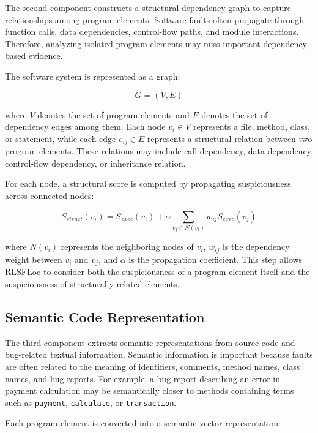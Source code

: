 \documentclass[article,article,submit,pdftex,moreauthors]{Definitions/mdpi}
\begin{document}
The second component constructs a structural dependency graph to capture relationships among program elements. Software faults often propagate through function calls, data dependencies, control-flow paths, and module interactions. Therefore, analyzing isolated program elements may miss important dependency-based evidence.

The software system is represented as a graph:

\begin{equation}
G = (V, E)
\end{equation}

where $V$ denotes the set of program elements and $E$ denotes the set of dependency edges among them. Each node $v_i \in V$ represents a file, method, class, or statement, while each edge $e_{ij} \in E$ represents a structural relation between two program elements. These relations may include call dependency, data dependency, control-flow dependency, or inheritance relation.

For each node, a structural score is computed by propagating suspiciousness across connected nodes:

\begin{equation}
S_{struct}(v_i) = S_{exec}(v_i) + \alpha \sum_{v_j \in N(v_i)} w_{ij} S_{exec}(v_j)
\end{equation}

where $N(v_i)$ represents the neighboring nodes of $v_i$, $w_{ij}$ is the dependency weight between $v_i$ and $v_j$, and $\alpha$ is the propagation coefficient. This step allows RLSFLoc to consider both the suspiciousness of a program element itself and the suspiciousness of structurally related elements.

\subsection{Semantic Code Representation}

The third component extracts semantic representations from source code and bug-related textual information. Semantic information is important because faults are often related to the meaning of identifiers, comments, method names, class names, and bug reports. For example, a bug report describing an error in payment calculation may be semantically closer to methods containing terms such as \texttt{payment}, \texttt{calculate}, or \texttt{transaction}.

Each program element is converted into a semantic vector representation:
\end{document}
